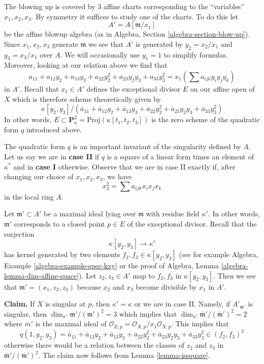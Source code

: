 \documentclass{stacks-project}
\theoremstyle{plain}
\theoremstyle{definition}
\theoremstyle{remark}
\numberwithin{equation}{subsection}
\begin{document}
\medskip\noindent
The blowing up is covered by $3$ affine charts corresponding to
the ``variables'' $x_1, x_2, x_3$. By symmetry it suffices to study
one of the charts. To do this let
$$
A' = A[\mathfrak m/x_1]
$$
be the affine blowup algebra (as in
Algebra, Section \ref{algebra-section-blow-up}).
Since $x_1, x_2, x_3$ generate $\mathfrak m$ we see that $A'$
is generated by $y_2 = x_2/x_1$ and $y_3 = x_3/x_1$ over $A$.
We will occasionally use $y_1 = 1$ to simplify formulas.
Moreover, looking at our relation above we find that
$$
a_{11} + a_{12} y_2 + a_{13} y_3 + a_{22} y_2^2 +
a_{23} y_2y_3 + a_{33} y_3^2 =
x_1 (\sum a_{ijk} y_iy_jy_k)
$$
in $A'$. Recall that $x_1 \in A'$ defines the exceptional divisor $E$
on our affine open of $X$
which is therefore scheme theoretically given by
$$
\kappa[y_2, y_3]/
(\overline{a}_{11} + \overline{a}_{12} y_2 + \overline{a}_{13} y_3 +
\overline{a}_{22} y_2^2 + \overline{a}_{23} y_2y_3 + \overline{a}_{33} y_3^2)
$$
In other words,
$E \subset \mathbf{P}^2_\kappa = \text{Proj}(\kappa[t_1, t_2, t_3])$ is
the zero scheme of the quadratic form $q$ introduced above.

\medskip\noindent
The quadratic form $q$ is an important invariant of the singularity
defined by $A$. Let us say we are in
{\bf case II} if $q$ is a square of a linear form times
an element of $\kappa^*$ and in {\bf case I} otherwise.
Observe that we are in case II exactly if, after
changing our choice of $x_1, x_2, x_3$, we have
$$
x_3^2 = \sum a_{ijk}x_ix_jx_k
$$
in the local ring $A$.

\medskip\noindent
Let $\mathfrak m' \subset A'$ be a maximal ideal lying over $\mathfrak m$
with residue field $\kappa'$. In other words, $\mathfrak m'$ corresponds
to a closed point $p \in E$ of the exceptional divisor. Recall that the
surjection
$$
\kappa[y_2, y_3] \to \kappa'
$$
has kernel generated by two elements $f_2, f_3 \in \kappa[y_2, y_3]$
(see for example Algebra, Example \ref{algebra-example-spec-kxy}
or the proof of
Algebra, Lemma \ref{algebra-lemma-dim-affine-space}).
Let $z_2, z_3 \in A'$ map to $f_2, f_3$ in $\kappa[y_2, y_3]$.
Then we see that $\mathfrak m' = (x_1, z_2, z_3)$ because
$x_2$ and $x_3$ become divisible by $x_1$ in $A'$.

\medskip\noindent
{\bf Claim.} If $X$ is singular at $p$, then $\kappa' = \kappa$ or we are
in case II. Namely, if $A'_{\mathfrak m'}$
is singular, then $\dim_{\kappa'} \mathfrak m'/(\mathfrak m')^2 = 3$
which implies that
$\dim_{\kappa'} \overline{\mathfrak m}'/(\overline{\mathfrak m}')^2 = 2$
where $\overline{m}'$ is the maximal ideal of
$\mathcal{O}_{E, p} = \mathcal{O}_{X, p}/x_1\mathcal{O}_{X, p}$.
This implies that
$$
q(1, y_2, y_3) =
\overline{a}_{11} + \overline{a}_{12} y_2 + \overline{a}_{13} y_3 +
\overline{a}_{22} y_2^2 + \overline{a}_{23} y_2y_3 + \overline{a}_{33} y_3^2
\in (f_2, f_3)^2
$$
otherwise there would be a relation between the classes of $z_2$
and $z_3$ in $\overline{\mathfrak m}'/(\overline{\mathfrak m}')^2$.
The claim now follows from Lemma \ref{lemma-issquare}.
\end{document}
